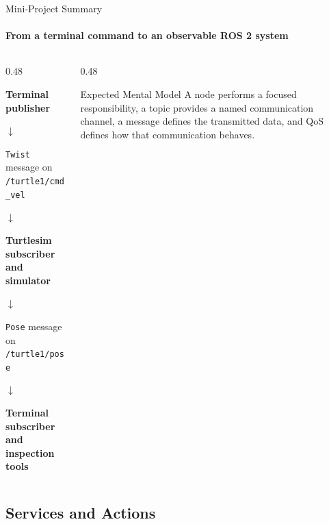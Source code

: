 \begin{frame}{Mini-Project Summary}
\framesubtitle{From a terminal command to an observable ROS 2 system}

\footnotesize

\begin{columns}[T,onlytextwidth]

    \begin{column}{0.48\textwidth}
        \begin{center}
            \textbf{Terminal publisher}

            \(\downarrow\)

            \texttt{Twist} message on \texttt{/turtle1/cmd\_vel}

            \(\downarrow\)

            \textbf{Turtlesim subscriber and simulator}

            \(\downarrow\)

            \texttt{Pose} message on \texttt{/turtle1/pose}

            \(\downarrow\)

            \textbf{Terminal subscriber and inspection tools}
        \end{center}
    \end{column}

    \begin{column}{0.48\textwidth}
        \pause
        \vspace{1.5cm} %
        \begin{alertblock}{Expected Mental Model}
            A node performs a focused responsibility, a topic provides a named
            communication channel, a message defines the transmitted data, and
            QoS defines how that communication behaves.
        \end{alertblock}
    \end{column}

\end{columns}

\end{frame}






\subsection{Services and Actions}

